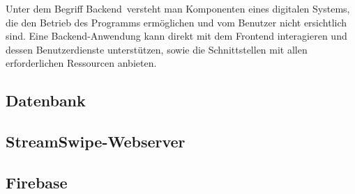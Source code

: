 Unter dem Begriff \glqq Backend\grqq \, versteht man Komponenten eines digitalen Systems, die den Betrieb des Programms ermöglichen und vom Benutzer nicht ersichtlich sind.
\newline
Eine Backend-Anwendung kann direkt mit dem Frontend interagieren und dessen Benutzerdienste unterstützen, sowie die Schnittstellen mit allen erforderlichen Ressourcen anbieten.

\subsection{Datenbank}


\subsection{StreamSwipe-Webserver}




\subsection{Firebase}
\label{sec:implementierung_firebase}

